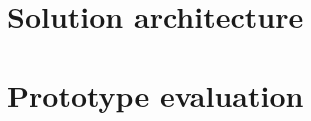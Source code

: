 

\section{Solution architecture}\label{section:solutionarchitecture}

\section{Prototype evaluation}\label{section:solutionarchitecture}







